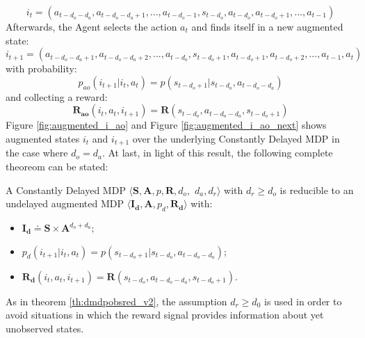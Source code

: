                 \[i_t = \left( a_{t-d_{o}-d_{a}}, a_{t-d_{o}-d_{a} +1}, ..., a_{t-d_{o}-1}, s_{t-d_{o}}, a_{t-d_{o}}, a_{t-d_{o}+1}, ..., a_{t-1} \right)\] Afterwards, the Agent selects the action $a_t$ and finds itself in a new augmented state: \[i_{t+1} = \left( a_{t-d_{o}-d_{a}+1}, a_{t-d_{o}-d_{a}+2}, ..., a_{t-d_{o}}, s_{t-d_{o}+1}, a_{t-d_{o}+1}, a_{t-d_{o}+2}, ..., a_{t-1}, a_{t}\right)\] with probability: \[p_{ao} \left( i_{t+1} | i_t, a_{t} \right) = p \left( s_{t-d_o+1} | s_{t-d_o}, a_{t-d_o-d_a} \right)\] and collecting a reward: \[\mathbf{R_{ao}}(i_t,a_t, i_{t+1}) = \mathbf{R}(s_{t-d_{o}}, a_{t-d_o-d_a}, s_{t-d_{o}+1})\] Figure \ref{fig:augmented_i_ao} and Figure \ref{fig:augmented_i_ao_next} shows augmented states $i_t$ and $i_{t+1}$ over the underlying Constantly Delayed MDP in the case where $d_o = d_a$. At last, in light of this result, the following complete theoreom can be stated:
                
                \begin{theorem}
                    \label{th:dmdpred}
                    A Constantly Delayed MDP $\langle \mathbf{S}, \mathbf{A}, p, \mathbf{R}, d_o,$ $d_a, d_r \rangle$ with $d_r \geq d_o$ is reducible to an undelayed augmented MDP $\langle \mathbf{I_d}, \mathbf{A}, p_d, \mathbf{R_d} \rangle$ with: 
                    \begin{itemize}[topsep=0.5em, partopsep=0.5em]
                        \setlength\itemsep{0em}
                        \item $\mathbf{I_d} \doteq \mathbf{S} \times \mathbf{A}^{d_o+d_a}$;
                        \item $p_d \left( i_{t+1} | i_t, a_{t} \right) = p \left( s_{t-d_o+1} | s_{t-d_o}, a_{t-d_o-d_a} \right)$;
                        \item $\mathbf{R_d}(i_t,a_t, i_{t+1}) = \mathbf{R}(s_{t-d_{o}}, a_{t-d_o-d_a}, s_{t-d_{o}+1})$.
                    \end{itemize}
                \end{theorem}
                
                As in theorem \ref{th:dmdpobsred_v2}, the assumption $d_r \geq d_0$ is used in order to avoid situations in which the reward signal provides information about yet unobserved states. 
            
                
